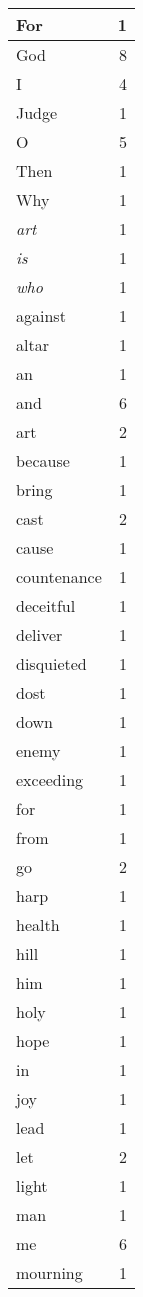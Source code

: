 \begin{center}
\begin{longtable}{l|r}
\hline \hline
\endlastfoot
For & 1 \\ \hline
God & 8 \\ \hline
I & 4 \\ \hline
Judge & 1 \\ \hline
O & 5 \\ \hline
Then & 1 \\ \hline
Why & 1 \\ \hline
\emph{art} & 1 \\ \hline
\emph{is} & 1 \\ \hline
\emph{who} & 1 \\ \hline
against & 1 \\ \hline
altar & 1 \\ \hline
an & 1 \\ \hline
and & 6 \\ \hline
art & 2 \\ \hline
because & 1 \\ \hline
bring & 1 \\ \hline
cast & 2 \\ \hline
cause & 1 \\ \hline
countenance & 1 \\ \hline
deceitful & 1 \\ \hline
deliver & 1 \\ \hline
disquieted & 1 \\ \hline
dost & 1 \\ \hline
down & 1 \\ \hline
enemy & 1 \\ \hline
exceeding & 1 \\ \hline
for & 1 \\ \hline
from & 1 \\ \hline
go & 2 \\ \hline
harp & 1 \\ \hline
health & 1 \\ \hline
hill & 1 \\ \hline
him & 1 \\ \hline
holy & 1 \\ \hline
hope & 1 \\ \hline
in & 1 \\ \hline
joy & 1 \\ \hline
lead & 1 \\ \hline
let & 2 \\ \hline
light & 1 \\ \hline
man & 1 \\ \hline
me & 6 \\ \hline
mourning & 1 \\ \hline

\end{longtable}
\end{center}
